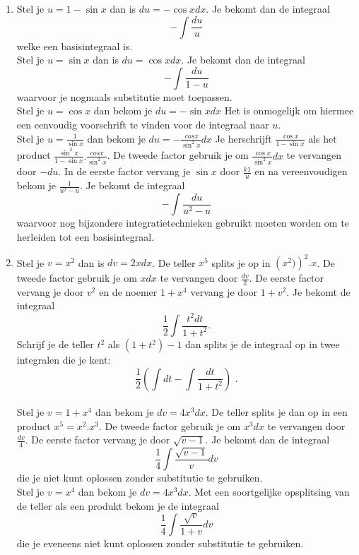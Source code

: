 \documentclass{article}
\begin{document}
\begin{enumerate}
\item

Stel je $u=1-\sin x$ dan is $du=-\cos x dx$.
Je bekomt dan de integraal
\[
-\int \frac{du}{u}
\]
welke een basisintegraal is.\\

Stel je $u=\sin x$ dan is $du=\cos x dx$.
Je bekomt dan de integraal
\[
-\int \frac {du}{1-u}
\]
waarvoor je nogmaals substitutie moet toepassen.\\

Stel je $u=\cos x$ dan bekom je $du=-\sin x dx$ Het is onmogelijk om hiermee een eenvoudig voorschrift te vinden voor de integraal naar $u$.\\

Stel je $u=\frac{1}{\sin x}$ dan bekom je $du =-\frac {\ cos x}{\sin ^2 x}dx$
Je herschrijft $\frac{\cos x}{1- \sin x}$ als het product $\frac{\sin^2 x}{1- \sin x}.\frac {cos x}{\sin ^2 x}$.
De tweede factor gebruik je om $\frac{\cos x}{\sin ^2 x}dx$ te vervangen door $-du$.
In de eerste factor vervang je $\sin x$ door $\frac{k1}{u}$ en na vereenvoudigen bekom je $\frac {1}{u^2-u}$.
Je bekomt de integraal
\[
-\int \frac {du}{u^2-u}
\]
waarvoor nog bijzondere integratietechnieken gebruikt moeten worden om te herleiden tot een basisintegraal.

\item

Stel je $v=x^2$ dan is $dv=2xdx$.
De teller $x^5$ splits je op in $\left( x^2) \right)^2.x$.
De tweede factor gebruik je om $xdx$ te vervangen door $\frac{dv}{2}$.
De eerste factor vervang je door $v^2$ en de noemer $1+x^4$ vervang je door $1+v^2$.
Je bekomt de integraal
\[
\frac{1}{2} \int \frac{t^2dt}{1+t^2} \text {.}
\]
Schrijf je de teller $t^2$ als $(1+t^2)-1$ dan splits je de integraal op in twee integralen die je kent:
\[
\frac{1}{2} \left( \int dt - \int \frac{dt}{1+t^2} \right) \text { .}
\]\\

Stel je $v=1+x^4$ dan bekom je $dv=4x^3dx$.
De teller splits je dan op in een product $x^5=x^2.x^3$.
De tweede factor gebruik je om $x^3dx$ te vervangen door $\frac{dv}{4}$.
De eerste factor vervang je door $\sqrt{v-1}$.
Je bekomt dan de integraal
\[
\frac{1}{4} \int \frac{\sqrt {v-1}}{v}dv
\]
die je niet kunt oplossen zonder substitutie te gebruiken.\\

Stel je $v=x^4$ dan bekom je $dv=4x^3dx$.
Met een soortgelijke opsplitsing van de teller als een produkt bekom je de integraal
\[
\frac{1}{4} \int \frac{\sqrt{v}}{1+v}dv
\]
die je eveneens niet kunt oplossen zonder substitutie te gebruiken.\\


\end{enumerate}
\end{document}

